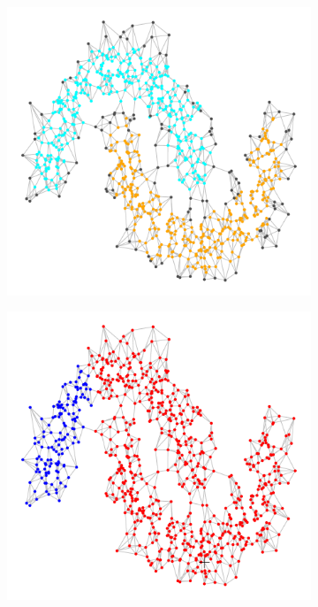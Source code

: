 \documentclass{article}
\newcommand{\1}{\mathbf{1}}
\theoremstyle{aldenthm}
\theoremstyle{aldenrmrk}
\begin{document}
\begin{figure}
\begin{adjustbox}{minipage=\linewidth,scale=0.8}
		\begin{subfigure}{.24\linewidth}
			\includegraphics[width=\linewidth]{example2plots/row3_true_density_cluster}
			\caption{}
		\end{subfigure}
		\begin{subfigure}{.24\linewidth}
			\includegraphics[width=\linewidth]{example2plots/row3_ppr_cluster}

\end{subfigure}
\end{adjustbox}
\end{figure}
\end{document}
